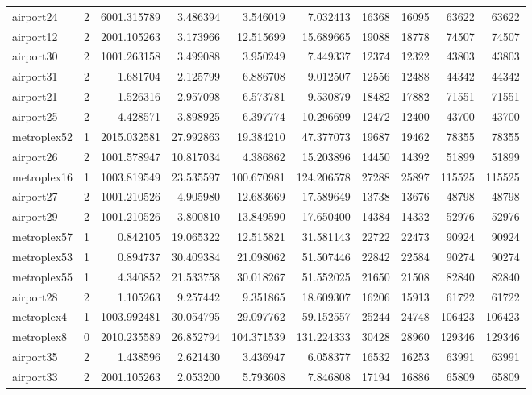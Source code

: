 \begin{longtable}{|l|r|r|r|r|r|r|r|r|r|}
airport24 & 2 & 6001.315789 & 3.486394 & 3.546019 & 7.032413 & 16368 & 16095 & 63622 & 63622 \\
airport12 & 2 & 2001.105263 & 3.173966 & 12.515699 & 15.689665 & 19088 & 18778 & 74507 & 74507 \\
airport30 & 2 & 1001.263158 & 3.499088 & 3.950249 & 7.449337 & 12374 & 12322 & 43803 & 43803 \\
airport31 & 2 & 1.681704 & 2.125799 & 6.886708 & 9.012507 & 12556 & 12488 & 44342 & 44342 \\
airport21 & 2 & 1.526316 & 2.957098 & 6.573781 & 9.530879 & 18482 & 17882 & 71551 & 71551 \\
airport25 & 2 & 4.428571 & 3.898925 & 6.397774 & 10.296699 & 12472 & 12400 & 43700 & 43700 \\
metroplex52 & 1 & 2015.032581 & 27.992863 & 19.384210 & 47.377073 & 19687 & 19462 & 78355 & 78355 \\
airport26 & 2 & 1001.578947 & 10.817034 & 4.386862 & 15.203896 & 14450 & 14392 & 51899 & 51899 \\
metroplex16 & 1 & 1003.819549 & 23.535597 & 100.670981 & 124.206578 & 27288 & 25897 & 115525 & 115525 \\
airport27 & 2 & 1001.210526 & 4.905980 & 12.683669 & 17.589649 & 13738 & 13676 & 48798 & 48798 \\
airport29 & 2 & 1001.210526 & 3.800810 & 13.849590 & 17.650400 & 14384 & 14332 & 52976 & 52976 \\
metroplex57 & 1 & 0.842105 & 19.065322 & 12.515821 & 31.581143 & 22722 & 22473 & 90924 & 90924 \\
metroplex53 & 1 & 0.894737 & 30.409384 & 21.098062 & 51.507446 & 22842 & 22584 & 90274 & 90274 \\
metroplex55 & 1 & 4.340852 & 21.533758 & 30.018267 & 51.552025 & 21650 & 21508 & 82840 & 82840 \\
airport28 & 2 & 1.105263 & 9.257442 & 9.351865 & 18.609307 & 16206 & 15913 & 61722 & 61722 \\
metroplex4 & 1 & 1003.992481 & 30.054795 & 29.097762 & 59.152557 & 25244 & 24748 & 106423 & 106423 \\
metroplex8 & 0 & 2010.235589 & 26.852794 & 104.371539 & 131.224333 & 30428 & 28960 & 129346 & 129346 \\
airport35 & 2 & 1.438596 & 2.621430 & 3.436947 & 6.058377 & 16532 & 16253 & 63991 & 63991 \\
airport33 & 2 & 2001.105263 & 2.053200 & 5.793608 & 7.846808 & 17194 & 16886 & 65809 & 65809 \\

\end{longtable}
